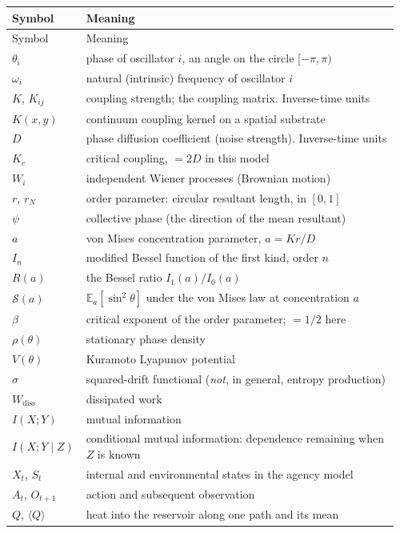 \documentclass[11pt]{article}
\newcommand{\Kc}{K_{c}}
\newcommand{\E}{\mathbb{E}}
\newcommand{\Wdiss}{W_{\mathrm{diss}}}
\begin{document}
\begin{center}
\begin{longtable}{@{}p{0.16\linewidth}p{0.80\linewidth}@{}}
\hline
Symbol & Meaning \\
\hline
\endfirsthead
\hline
Symbol & Meaning \\
\hline
\endhead
$\theta_i$ & phase of oscillator $i$, an angle on the circle $[-\pi,\pi)$ \\
$\omega_i$ & natural (intrinsic) frequency of oscillator $i$ \\
$K$, $K_{ij}$ & coupling strength; the coupling matrix. Inverse-time units \\
$K(x,y)$ & continuum coupling kernel on a spatial substrate \\
$D$ & phase diffusion coefficient (noise strength). Inverse-time units \\
$\Kc$ & critical coupling, $=2D$ in this model \\
$W_i$ & independent Wiener processes (Brownian motion) \\
$r$, $r_N$ & order parameter: circular resultant length, in $[0,1]$ \\
$\psi$ & collective phase (the direction of the mean resultant) \\
$a$ & von Mises concentration parameter, $a=Kr/D$ \\
$I_n$ & modified Bessel function of the first kind, order $n$ \\
$R(a)$ & the Bessel ratio $I_1(a)/I_0(a)$ \\
$\mathcal{S}(a)$ & $\E_a[\sin^2\theta]$ under the von Mises law at concentration $a$ \\
$\beta$ & critical exponent of the order parameter; $=1/2$ here \\
$\rho(\theta)$ & stationary phase density \\
$V(\theta)$ & Kuramoto Lyapunov potential \\
$\sigma$ & squared-drift functional (\emph{not}, in general, entropy production) \\
$\Wdiss$ & dissipated work \\
$I(X;Y)$ & mutual information \\
$I(X;Y\mid Z)$ & conditional mutual information: dependence remaining when $Z$ is known \\
$X_t$, $S_t$ & internal and environmental states in the agency model \\
$A_t$, $O_{t+1}$ & action and subsequent observation \\
$Q$, $\langle Q\rangle$ & heat into the reservoir along one path and its mean \\

\end{longtable}
\end{center}
\end{document}
